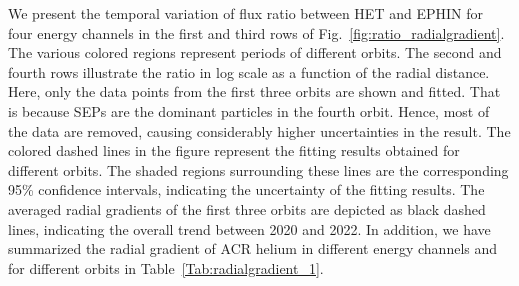 We present the temporal variation of flux ratio between \ac{HET} and \ac{EPHIN} for four energy channels in the first and third rows of Fig.~\ref{fig:ratio_radialgradient}. The various colored regions represent periods of different orbits. The second and fourth rows illustrate the ratio in log scale as a function of the radial distance. Here, only the data points from the first three orbits are shown and fitted. That is because \acp{SEP} are the dominant particles in the fourth orbit. Hence, most of the data are removed, causing considerably higher uncertainties in the result. The colored dashed lines in the figure represent the fitting results obtained for different orbits. The shaded regions surrounding these lines are the corresponding 95\% confidence intervals,  indicating the uncertainty of the fitting results. The averaged radial gradients of the first three orbits are depicted as black dashed lines, indicating the overall trend between 2020 and 2022.
In addition, we have summarized the radial gradient of \ac{ACR} helium in different energy channels and for different orbits in Table~\ref{Tab:radialgradient_1}.

